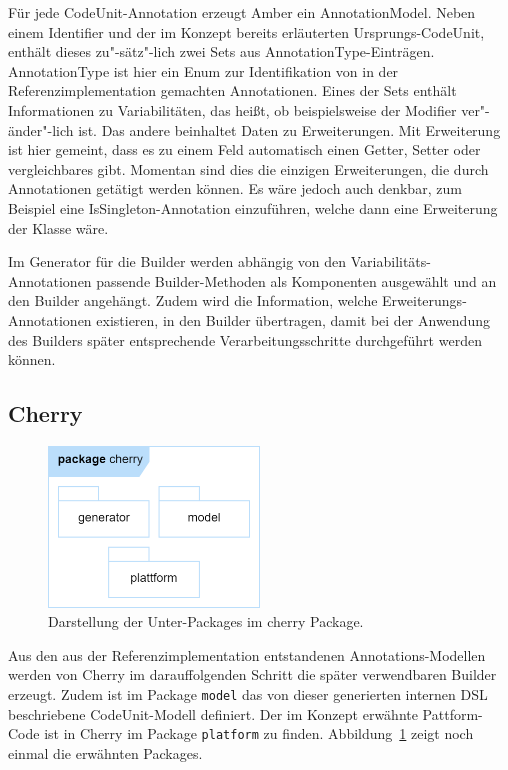 \documentclass[12pt,oneside,a4paper,parskip]{scrbook}
\begin{document}
Für jede CodeUnit-Annotation erzeugt Amber ein AnnotationModel. Neben einem Identifier und der im Konzept bereits erläuterten Ursprungs-CodeUnit, enthält dieses zu"-sätz"-lich zwei Sets aus AnnotationType-Einträgen. AnnotationType ist hier ein Enum zur Identifikation von in der Referenzimplementation gemachten Annotationen. Eines der Sets enthält Informationen zu Variabilitäten, das heißt, ob beispielsweise der Modifier ver"-änder"-lich ist. Das andere beinhaltet Daten zu Erweiterungen. Mit Erweiterung ist hier gemeint, dass es zu einem Feld automatisch einen Getter, Setter oder vergleichbares gibt. Momentan sind dies die einzigen Erweiterungen, die durch Annotationen getätigt werden können. Es wäre jedoch auch denkbar, zum Beispiel eine IsSingleton-Annotation einzuführen, welche dann eine Erweiterung der Klasse wäre.

Im Generator für die Builder werden abhängig von den Variabilitäts-Annotationen passende Builder-Methoden als Komponenten ausgewählt und an den Builder angehängt. Zudem wird die Information, welche Erweiterungs-Annotationen existieren, in den Builder übertragen, damit bei der Anwendung des Builders später entsprechende Verarbeitungsschritte durchgeführt werden können.

\subsection{Cherry}

\begin{figure}[htbp]
	\centering
	\includegraphics[width=0.5\textwidth]{bilder/cherry}
	\caption{Darstellung der Unter-Packages im cherry Package.}
	\label{fig:cherryPackages}
\end{figure}
Aus den aus der Referenzimplementation entstandenen Annotations-Modellen werden von Cherry im darauffolgenden Schritt die später verwendbaren Builder erzeugt. Zudem ist im Package \texttt{model} das von dieser generierten internen DSL beschriebene CodeUnit-Modell definiert. Der im Konzept erwähnte Pattform-Code ist in Cherry im Package \texttt{platform} zu finden. Abbildung~\ref{fig:cherryPackages} zeigt noch einmal die erwähnten Packages.
\end{document}
